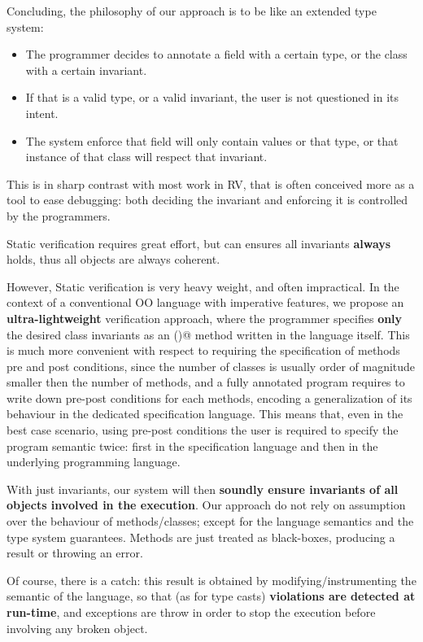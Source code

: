
Concluding, 
the philosophy of our approach is to be like an extended type system: 
\begin{itemize}
\item The programmer decides to annotate a field with a certain type, or the class with a certain invariant.
\item If that is a valid type, or a valid invariant, the user is not questioned in its intent.
\item The system enforce that field will only contain values or that type, or that instance of that class
will respect that invariant.
\end{itemize}
This is in sharp contrast with most work in RV, that is often conceived more as a tool to ease debugging:
both deciding the invariant and enforcing it is controlled by the programmers.

Static verification requires great effort, but can ensures all invariants \textbf{always} holds, thus all objects are always coherent.

However, Static verification is very heavy weight, and often impractical.
In the context of a conventional OO language with imperative features,
we propose an \textbf{ultra-lightweight} verification approach,
where the programmer specifies \textbf{only} the desired class invariants as an 
\Q@invariant()@ method written in the language itself.
This is much more convenient with respect to requiring the specification of methods pre and post conditions,
since the number of classes is usually order of magnitude smaller then the number of methods,
and a fully annotated program requires to write down 
pre-post conditions for each methods, encoding a generalization of its behaviour
in the dedicated specification language.
This means that, even in the best case scenario, 
using pre-post conditions
the user is required to specify the program semantic twice:
first in the specification language and then in the underlying programming language.


With just invariants, our system will then 
\textbf{soundly ensure invariants of all objects involved in the execution}.
Our approach do not rely on assumption over the behaviour of methods/classes;
except for the language semantics and the type system guarantees.
Methods are just treated as black-boxes, producing a result or throwing an error.

Of course, there is a catch: this result is obtained by modifying/instrumenting the
semantic of the language, so that (as for type casts) \textbf{violations are detected at run-time}, and exceptions
are throw in order to stop the execution before involving any broken object.
